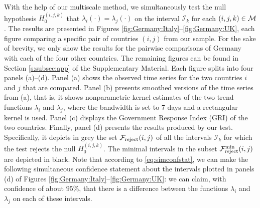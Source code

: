 \documentclass[a4paper,12pt]{article}
\numberwithin{equation}{section}
\begin{document}
With the help of our multiscale method, we simultaneously test the null hypothesis $H_0^{(i, j, k)}$ that $\lambda_i(\cdot) = \lambda_j(\cdot)$ on the interval $\mathcal{I}_k$ for each $(i, j, k) \in \mathcal{M}$. The results are presented in Figures \ref{fig:Germany:Italy}--\ref{fig:Germany:UK}, each figure comparing a specific pair of countries $(i,j)$ from our sample. For the sake of brevity, we only show the results for the pairwise comparisons of Germany with each of the four other countries. The remaining figures can be found in Section \ref{s:subsec:app} of the Supplementary Material. Each figure splits into four panels (a)--(d).  Panel (a) shows the observed time series for the two countries $i$ and $j$ that are compared. Panel (b) presents smoothed versions of the time series from (a), that is, it shows nonparametric kernel estimates of the two trend functions $\lambda_i$ and $\lambda_j$, where the bandwidth is set to $7$ days and a rectangular kernel is used. Panel (c) displays the Government Response Index (GRI) of the two countries. Finally, panel (d) presents the results produced by our test. Specifically, it depicts in grey the set $\mathcal{F}_{\text{reject}}(i,j)$ of all the intervals $\mathcal{I}_k$ for which the test rejects the null $H_0^{(i, j, k)}$. The minimal intervals in the subset $\mathcal{F}_{\text{reject}}^{\text{min}}(i, j)$ are depicted in black. Note that according to \eqref{eq:simconfstat}, we can make the following simultaneous confidence statement about the intervals plotted in panels (d) of Figures \ref{fig:Germany:Italy}--\ref{fig:Germany:UK}: we can claim, with confidence of about $95\%$, that there is a difference between the functions $\lambda_i$ and $\lambda_j$ on each of these intervals.
\end{document}
